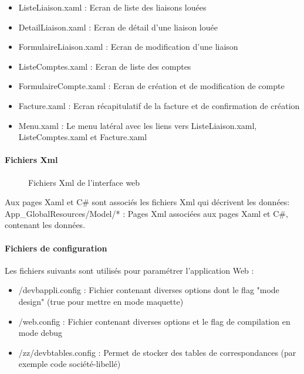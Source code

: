 \documentclass[a4paper,french,8pt]{article}
\begin{document}
					\begin{itemize}
						\item ListeLiaison.xaml : Ecran de liste des liaisons louées
						\item DetailLiaison.xaml : Ecran de détail d’une liaison louée
						\item FormulaireLiaison.xaml : Ecran de modification d'une liaison
						\item ListeComptes.xaml	: Ecran de liste des comptes
						\item FormulaireCompte.xaml	: Ecran de création et de modification de compte
						\item Facture.xaml : Ecran récapitulatif de la facture et de confirmation de création
						\item Menu.xaml	: Le menu latéral avec les liens vers ListeLiaison.xaml, ListeComptes.xaml et Facture.xaml
					\end{itemize}

				\paragraph{Fichiers Xml}
				      \begin{figure}[h!]
					\caption{Fichiers Xml de l'interface web}
					\centering
					\end{figure} 
					Aux pages Xaml et C\# sont associés les fichiers Xml qui décrivent les données: \\
					App\_GlobalResources/Model/* : Pages Xml associées aux pages Xaml et C\#, contenant les données.

				\paragraph{Fichiers de configuration}
% 					
					Les fichiers suivants sont utilisés pour paramétrer l’application Web :
					\begin{itemize}
						\item /devbappli.config : Fichier contenant diverses options dont le flag "mode design" (true pour mettre en mode maquette)
						\item /web.config : Fichier contenant diverses options et le flag de compilation en mode debug
						\item /zz/devbtables.config	: Permet de stocker des tables de correspondances (par exemple code société-libellé)
					\end{itemize}
		
\end{document}
